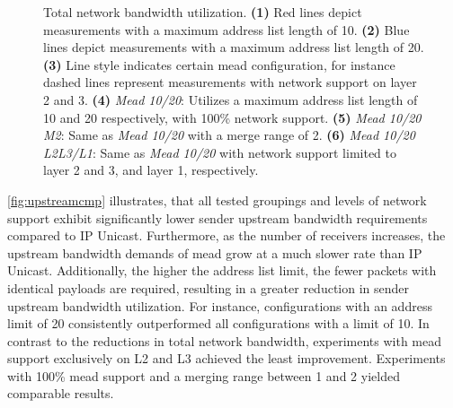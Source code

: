 \begin{figure}
    \begin{center}
        
    \end{center}
    \caption[UC1 Live stream: Total network bandwidth utilization]{
        \nuci{} Total network bandwidth utilization.
        \textbf{(1)} Red lines depict measurements with a maximum address list length of 10.
        \textbf{(2)} Blue lines depict measurements with a maximum address list length of 20.
        \textbf{(3)} Line style indicates certain \gls{mead} configuration, for
            instance dashed lines represent measurements with network support
            on layer 2 and 3.
        \textbf{(4)} \textit{Mead 10/20}:
            Utilizes a maximum address list length of 10 and 20 respectively,
            with 100\% network support.
        \textbf{(5)} \textit{Mead 10/20 M2}:
            Same as \textit{Mead 10/20} with a merge range of 2.
        \textbf{(6)} \textit{Mead 10/20 L2L3/L1}:
            Same as \textit{Mead 10/20} with network support limited to layer 2 and 3,
            and layer 1, respectively.
        }
    \label{fig:netloadcmp}
\end{figure}

\autoref{fig:upstreamcmp} illustrates, that all tested groupings and levels of
    network support exhibit significantly lower sender upstream bandwidth
    requirements compared to IP Unicast.
Furthermore, as the number of receivers increases, the upstream bandwidth
    demands of \gls{mead} grow at a much slower rate than IP Unicast.
Additionally, the higher the address list limit, the fewer packets with
    identical payloads are required, resulting in a greater reduction in sender
    upstream bandwidth utilization.
For instance, configurations with an address limit of 20 consistently
    outperformed all configurations with a limit of 10.
In contrast to the reductions in total network bandwidth, experiments with
    \gls{mead} support exclusively on L2 and L3 achieved the least improvement.
Experiments with 100\% \gls{mead} support and a merging range between 1 and 2
    yielded comparable results.

